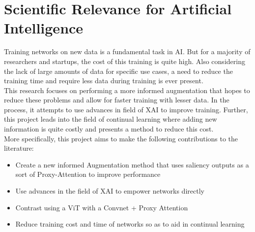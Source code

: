 \section{Scientific Relevance for Artificial Intelligence} \label{section:relevance}
Training networks on new data is a fundamental task in AI. But for a majority of researchers and startups, the cost of this training is quite high. Also considering the lack of large amounts of data for specific use cases, a need to reduce the training time and require less data during training is ever present.\\
This research focuses on performing a more informed augmentation that hopes to reduce these problems and allow for faster training with lesser data. In the process, it attempts to use advances in field of XAI to improve training. Further, this project leads into the field of continual learning where adding new information is quite costly and presents a method to reduce this cost.\\
More specifically, this project aims to make the following contributions to the literature:
\begin{itemize}
    \item Create a new informed Augmentation method that uses saliency outputs as a sort of Proxy-Attention to improve performance
    \item Use advances in the field of XAI to empower networks directly
    \item Contrast using a ViT \cite{dosovitskiy2020image} with a Convnet + Proxy Attention
    \item Reduce training cost and time of networks so as to aid in continual learning
\end{itemize}